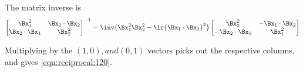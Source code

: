 {The matrix inverse is
\begin{dmath}\label{eqn:2dreciprocalMatrixCalculation:240}
{
\begin{bmatrix}
\Bx_1^2 & \Bx_1 \cdot \Bx_2 \\
\Bx_2 \cdot \Bx_1 & \Bx_2^2 \\
\end{bmatrix}
}^{-1}
=
\inv{ \Bx_1^2 \Bx_2^2 - \lr{\Bx_1 \cdot \Bx_2}^2 }
\begin{bmatrix}
\Bx_2^2 & -\Bx_1 \cdot \Bx_2 \\
-\Bx_2 \cdot \Bx_1 & \Bx_1^2 \\
\end{bmatrix}
\end{dmath}

Multiplying by the \( (1,0), and (0,1) \) vectors picks out the respective columns, and gives \cref{eqn:reciprocal:120}.
} %
